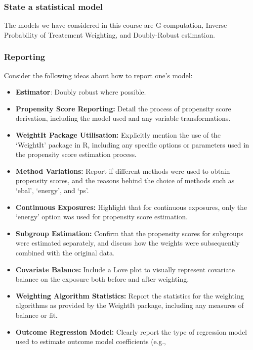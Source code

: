 \documentclass[
  singlecolumn]{article}
\providecommand{\tightlist}{%
  \setlength{\itemsep}{0pt}\setlength{\parskip}{0pt}}\usepackage{longtable,booktabs,array}
\begin{document}
\subsubsection{State a statistical
model}\label{state-a-statistical-model}

The models we have considered in this course are G-computation, Inverse
Probability of Treatement Weighting, and Doubly-Robust estimation.

\subsubsection{Reporting}\label{reporting}

Consider the following ideas about how to report one's model:

\begin{itemize}
\tightlist
\item
  \textbf{Estimator}: Doubly robust where possible.
\item
  \textbf{Propensity Score Reporting:} Detail the process of propensity
  score derivation, including the model used and any variable
  transformations.
\item
  \textbf{WeightIt Package Utilisation:} Explicitly mention the use of
  the `WeightIt' package in R, including any specific options or
  parameters used in the propensity score estimation process.
\item
  \textbf{Method Variations:} Report if different methods were used to
  obtain propensity scores, and the reasons behind the choice of methods
  such as `ebal', `energy', and `ps'.
\item
  \textbf{Continuous Exposures:} Highlight that for continuous
  exposures, only the `energy' option was used for propensity score
  estimation.
\item
  \textbf{Subgroup Estimation:} Confirm that the propensity scores for
  subgroups were estimated separately, and discuss how the weights were
  subsequently combined with the original data.
\item
  \textbf{Covariate Balance:} Include a Love plot to visually represent
  covariate balance on the exposure both before and after weighting.
\item
  \textbf{Weighting Algorithm Statistics:} Report the statistics for the
  weighting algorithms as provided by the WeightIt package, including
  any measures of balance or fit.
\item
  \textbf{Outcome Regression Model:} Clearly report the type of
  regression model used to estimate outcome model coefficients (e.g.,

\end{itemize}
\end{document}
